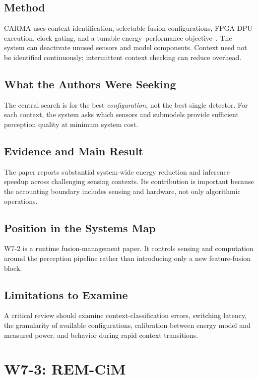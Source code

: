 \subsection{Method}

CARMA uses context identification, selectable fusion configurations, FPGA DPU execution, clock gating, and a tunable energy--performance objective~\cite{zhang2023carma}. The system can deactivate unused sensors and model components. Context need not be identified continuously; intermittent context checking can reduce overhead.

\subsection{What the Authors Were Seeking}

The central search is for the best \emph{configuration}, not the best single detector. For each context, the system asks which sensors and submodels provide sufficient perception quality at minimum system cost.

\subsection{Evidence and Main Result}

The paper reports substantial system-wide energy reduction and inference speedup across challenging sensing contexts. Its contribution is important because the accounting boundary includes sensing and hardware, not only algorithmic operations.

\subsection{Position in the Systems Map}

W7-2 is a runtime fusion-management paper. It controls sensing and computation around the perception pipeline rather than introducing only a new feature-fusion block.

\subsection{Limitations to Examine}

A critical review should examine context-classification errors, switching latency, the granularity of available configurations, calibration between energy model and measured power, and behavior during rapid context transitions.

\section{W7-3: REM-CiM}

